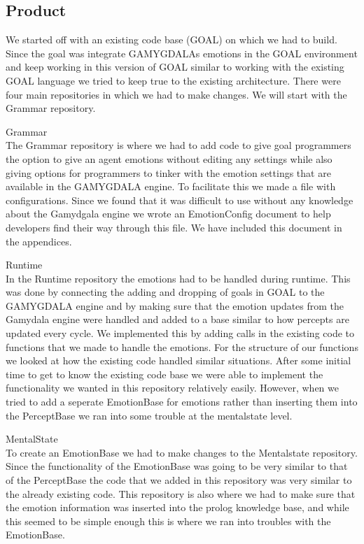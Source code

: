 \documentclass[11pt]{article}
\begin{document}
\subsection{Product}
We started off with an existing code base (GOAL\cite{GOAL}) on which we had to build. Since the goal was integrate GAMYGDALAs emotions in the GOAL environment and keep working in this version of GOAL similar to working with the existing GOAL language we tried to keep true to the existing architecture. There were four main repositories in which we had to make changes. We will start with the Grammar repository.\par
Grammar\\
The Grammar repository is where we had to add code to give goal programmers the option to give an agent emotions without editing any settings while also giving options for programmers to tinker with the emotion settings that are available in the GAMYGDALA engine. To facilitate this we made a file with configurations. Since we found that it was difficult to use without any knowledge about the Gamydgala engine we wrote an EmotionConfig document to help developers find their way through this file. We have included this document in the appendices. \par
Runtime\\ 
In the Runtime repository the emotions had to be handled during runtime. This was done by connecting the adding and dropping of goals in GOAL to the GAMYGDALA engine and by making sure that the emotion updates from the Gamydala engine were handled and added to a base similar to how percepts are updated every cycle. We implemented this by adding calls in the existing code to functions that we made to handle the emotions. For the structure of our functions we looked at how the existing code handled similar situations. After some initial time to get to know the existing code base we were able to implement the functionality we wanted in this repository relatively easily. However, when we tried to add a seperate EmotionBase for emotions rather than inserting them into the PerceptBase we ran into some trouble at the mentalstate level. \par 
MentalState\\
To create an EmotionBase we had to make changes to the Mentalstate repository. Since the functionality of the EmotionBase was going to be very similar to that of the PerceptBase the code that we added in this repository was very similar to the already existing code. This repository is also where we had to make sure that the emotion information was inserted into the prolog knowledge base, and while this seemed to be simple enough this is where we ran into troubles with the EmotionBase. \par 
\end{document}
